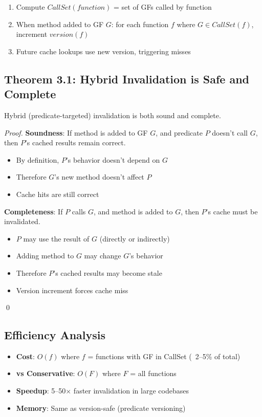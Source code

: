 \documentclass[sigplan,review,anonymous]{acmart}
\begin{document}
\begin{enumerate}
\item Compute $CallSet(function)$ = set of GFs called by function
\item When method added to GF $G$: for each function $f$ where $G \in CallSet(f)$, increment $version(f)$
\item Future cache lookups use new version, triggering misses
\end{enumerate}

\subsection{Theorem 3.1: Hybrid Invalidation is Safe and Complete}

\begin{theorem}
Hybrid (predicate-targeted) invalidation is both sound and complete.
\end{theorem}

\begin{proof}
\textbf{Soundness}: If method is added to GF $G$, and predicate $P$ doesn't call $G$, then $P$'s cached results remain correct.
\begin{itemize}
\item By definition, $P$'s behavior doesn't depend on $G$
\item Therefore $G$'s new method doesn't affect $P$
\item Cache hits are still correct \checkmark
\end{itemize}

\textbf{Completeness}: If $P$ calls $G$, and method is added to $G$, then $P$'s cache must be invalidated.
\begin{itemize}
\item $P$ may use the result of $G$ (directly or indirectly)
\item Adding method to $G$ may change $G$'s behavior
\item Therefore $P$'s cached results may become stale
\item Version increment forces cache miss \checkmark
\end{itemize}
\qed
\end{proof}

\subsection{Efficiency Analysis}

\begin{itemize}
\item \textbf{Cost}: $O(f)$ where $f$ = functions with GF in CallSet (~2--5\% of total)
\item \textbf{vs Conservative}: $O(F)$ where $F$ = all functions
\item \textbf{Speedup}: 5--50$\times$ faster invalidation in large codebases
\item \textbf{Memory}: Same as version-safe (predicate versioning)
\end{itemize}
\end{document}
